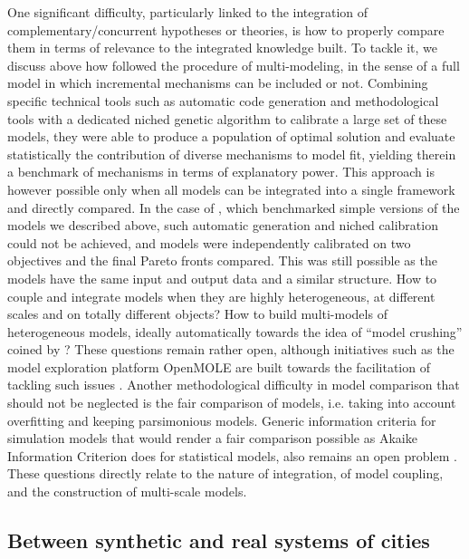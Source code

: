 \documentclass[10pt]{article}
\begin{document}
One significant difficulty, particularly linked to the integration of complementary/concurrent hypotheses or theories, is how to properly compare them in terms of relevance to the integrated knowledge built. To tackle it, we discuss above how \cite{cottineau2015modular} followed the procedure of multi-modeling, in the sense of a full model in which incremental mechanisms can be included or not. Combining specific technical tools such as automatic code generation and methodological tools with a dedicated niched genetic algorithm to calibrate a large set of these models, they were able to produce a population of optimal solution and evaluate statistically the contribution of diverse mechanisms to model fit, yielding therein a benchmark of mechanisms in terms of explanatory power. This approach is however possible only when all models can be integrated into a single framework and directly compared. In the case of \citep{raimbault2020empowering}, which benchmarked simple versions of the models we described above, such automatic generation and niched calibration could not be achieved, and models were independently calibrated on two objectives and the final Pareto fronts compared. This was still possible as the models have the same input and output data and a similar structure. How to couple and integrate models when they are highly heterogeneous, at different scales and on totally different objects? How to build multi-models of heterogeneous models, ideally automatically towards the idea of ``model crushing'' coined by \citep{openshaw1993modelling}? These questions remain rather open, although initiatives such as the model exploration platform OpenMOLE are built towards the facilitation of tackling such issues \citep{raimbault2019methods}. Another methodological difficulty in model comparison that should not be neglected is the fair comparison of models, i.e. taking into account overfitting and keeping parsimonious models. Generic information criteria for simulation models that would render a fair comparison possible as Akaike Information Criterion does for statistical models, also remains an open problem \citep{raimbault2020indirect}. These questions directly relate to the nature of integration, of model coupling, and the construction of multi-scale models.


\subsection{Between synthetic and real systems of cities}
\end{document}
